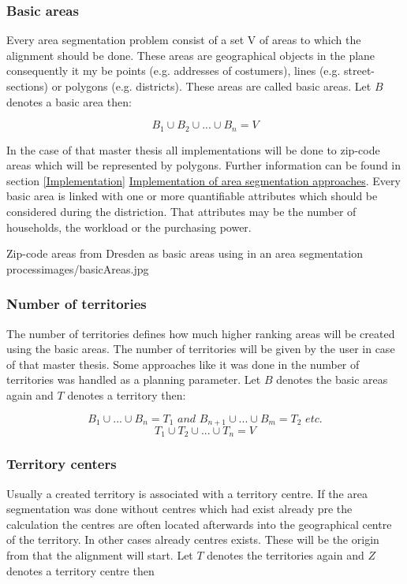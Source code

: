 \subsubsection{Basic areas}
Every area segmentation problem consist of a set V of areas to which the alignment should be done. These areas are geographical objects in the plane consequently it my be points (e.g. addresses of costumers), lines (e.g. street-sections) or polygons (e.g. districts). These areas are called basic areas. Let $ B $ denotes a basic area then:

\[ \mathit{B_{1} \cup B_{2} \cup ... \cup B_{n}=V} \]

In the case of that master thesis all implementations will be done to zip-code areas which will be represented by polygons. Further information can be found in section \ref{Implementation} \hyperref[Implementation]{Implementation of area segmentation approaches}. Every basic area is linked with one or more quantifiable attributes which should be considered during the distriction. That attributes may be the number of households, the workload or the purchasing power.

\begin{figureOwn}{Zip-code areas from Dresden as basic areas using in an area segmentation process}{images/basicAreas.jpg}\end{figureOwn}

\subsubsection{Number of territories}
The number of territories defines how much higher ranking areas will be created using the basic areas. The number of territories will be given by the user in case of that master thesis. Some approaches like it was done in \citeauthor{kalcsics} \cite{kalcsics} the number of territories was handled as a planning parameter. Let $ B $ denotes the basic areas again and $ T $ denotes a territory then:

\[ \mathit{B_{1} \cup  ... \cup B_{n}=T_{1} \text{ and } B_{n+1} \cup ... \cup B_{m}=T_{2} \text{ etc.}}\]
\[ \mathit{T_{1} \cup  T_{2} \cup ... \cup T_{n}=V}\]

\subsubsection{Territory centers}
Usually a created territory is associated with a territory centre. If the area segmentation was done without centres which had exist already pre the 
calculation the centres are often located afterwards into the geographical centre of the territory. In other cases already centres exists. These will be the origin from that the alignment will start. Let $ T $ denotes the territories again and $ Z $ denotes a territory centre then

